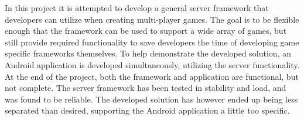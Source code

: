 
In this project it is attempted to develop a general server framework that developers can utilize when creating multi-player games. The goal is to be flexible enough that the framework can be used to support a wide array of games, but still provide required functionality to save developers the time of developing game specific frameworks themselves. To help demonstrate the developed solution, an Android application is developed simultaneously, utilizing the server functionality. At the end of the project, both the framework and application are functional, but not complete. The server framework has been tested in stability and load, and was found to be reliable. The developed solution has however ended up being less separated than desired, supporting the Android application a little too specific.